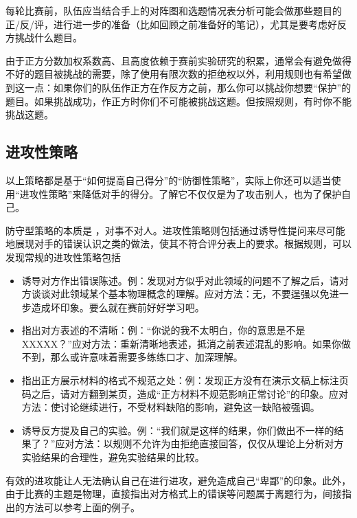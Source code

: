 \documentclass[a4paper,10pt,english]{sphinxmanual}
\begin{document}
每轮比赛前，队伍应当结合手上的对阵图和选题情况表分析可能会做那些题目的正/反/评，进行进一步的准备（比如回顾之前准备好的笔记），尤其是要考虑好反方挑战什么题目。

由于正方分数加权系数高、且高度依赖于赛前实验研究的积累，通常会有避免做得不好的题目被挑战的需要，除了使用有限次数的拒绝权以外，利用规则也有希望做到这一点：如果你们的队伍作正方在作反方之前，那么你可以挑战你想要“保护”的题目。如果挑战成功，作正方时你们不可能被挑战这题。但按照规则，有时你不能挑战这题。


\subsection{进攻性策略}
\label{\detokenize{6. Tournament:id12}}
以上策略都是基于“如何提高自己得分”的“防御性策略”，实际上你还可以适当使用“进攻性策略”来降低对手的得分。了解它不仅仅是为了攻击别人，也为了保护自己。

防守型策略的本质是  ，对事不对人。进攻性策略则包括通过诱导性提问来尽可能地展现对手的错误认识之类的做法，使其不符合评分表上的要求。根据规则，可以发现常规的进攻性策略包括
\begin{itemize}
\item {} 
诱导对方作出错误陈述。例：发现对方似乎对此领域的问题不了解之后，请对方谈谈对此领域某个基本物理概念的理解。应对方法：无，不要逞强以免进一步造成坏印象。要么就在赛前好好学习吧。

\item {} 
指出对方表述的不清晰：例：“你说的我不太明白，你的意思是不是XXXXX？”应对方法：重新清晰地表述，抵消之前表述混乱的影响。如果你做不到，那么或许意味着需要多练练口才、加深理解。

\item {} 
指出正方展示材料的格式不规范之处：例：发现正方没有在演示文稿上标注页码之后，请对方翻到某页，造成“正方材料不规范影响正常讨论”的印象。应对方法：使讨论继续进行，不受材料缺陷的影响，避免这一缺陷被强调。

\item {} 
诱导反方提及自己的实验。例：“我们就是这样的结果，你们做出不一样的结果了？”应对方法：以规则不允许为由拒绝直接回答，仅仅从理论上分析对方实验结果的合理性，避免实验结果的比较。

\end{itemize}

有效的进攻能让人无法确认自己在进行进攻，避免造成自己“卑鄙”的印象。此外，由于比赛的主题是物理，直接指出对方格式上的错误等问题属于离题行为，间接指出的方法可以参考上面的例子。
\end{document}
